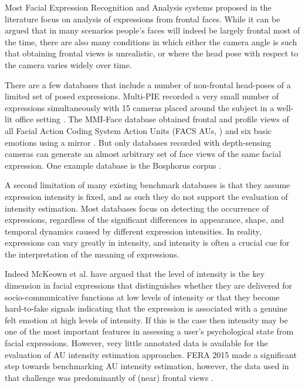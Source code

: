 \documentclass[a4paper, 10pt, conference]{ieeeconf}      \usepackage{FG2017}
\begin{document}
Most Facial Expression Recognition and Analysis systems proposed in the literature focus on analysis of expressions from frontal faces. While it can be argued that in many scenarios people's faces will indeed be largely frontal most of the time, there are also many conditions in which either the camera angle is such that obtaining frontal views is unrealistic, or where the head pose with respect to the camera varies widely over time.

There are a few databases that include a number of non-frontal head-poses of a limited set of posed expressions. Multi-PIE recorded a very small number of expressions simultaneously with 15 cameras placed around the subject in a well-lit office setting \cite{GrossEtAl2010_MPI}. The MMI-Face database obtained frontal and profile views of all  Facial Action Coding System Action Units (FACS AUs, \cite{FACS2}) and six basic emotions using a mirror \cite{ValstarEtAl10_IDH}. But only databases recorded with depth-sensing cameras can generate an almost arbitrary set of face views of the same facial expression. One example database is the Bosphorus corpus \cite{SavranEtAl2008_BD3}. 

A second limitation of many existing benchmark databases is that they assume expression intensity is fixed, and as such they do not support the evaluation of intensity estimation. Most databases focus on detecting the occurrence of expressions, regardless of the significant differences in appearance, shape, and temporal dynamics caused by different expression intensities. In reality, expressions can vary greatly in intensity, and intensity is often a crucial cue for the interpretation of the meaning of expressions. 

Indeed McKeown et al. \cite{McKeown2015_UNL} have argued that the level of intensity is the key dimension in facial expressions that distinguishes whether they are delivered for socio-communicative functions at low levels of intensity or that they become hard-to-fake signals indicating that the expression is associated with a genuine felt emotion at high levels of intensity. If this is the case then intensity may be one of the most important features in assessing a user's psychological state from facial expressions.  However, very little annotated data is available for the evaluation of AU intensity estimation approaches. FERA 2015 made a significant step towards benchmarking AU intensity estimation, however, the data used in that challenge was predominantly of (near) frontal views \cite{ValstarEtAl2015_F2S}.
\end{document}
